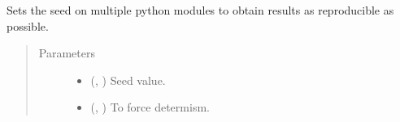 \documentclass[letterpaper,10pt,english]{sphinxmanual}
\begin{document}
\begin{fulllineitems}
\label{\detokenize{utils/util:utils.util.set_seed}}
Sets the seed on multiple python modules to obtain results as reproducible as possible.
\begin{quote}\begin{description}
\item[{Parameters}] \leavevmode\begin{itemize}
\item {} 
 (, ) \textendash{} Seed value.

\item {} 
 (, ) \textendash{} To force determism.

\end{itemize}

\end{description}\end{quote}

\end{fulllineitems}

\end{document}
